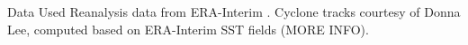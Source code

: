 \begin{block}{Data Used}
    Reanalysis data from ERA-Interim \cite{Dee2011}.
    Cyclone tracks courtesy of Donna Lee, computed based on ERA-Interim SST fields (MORE INFO).
\end{block}
